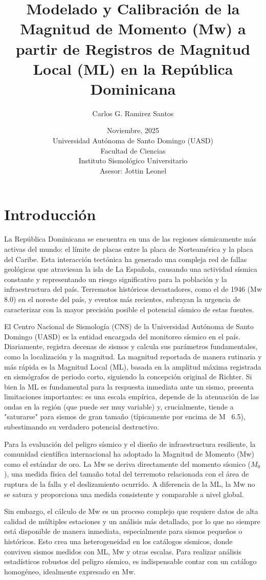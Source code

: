\documentclass[12pt,a4paper]{article}
\title{Modelado y Calibración de la Magnitud de Momento (Mw) a partir de Registros de Magnitud Local (ML) en la República Dominicana}
\author{Carlos G. Ramirez Santos}
\date{Noviembre, 2025 \\ \vspace{0.5cm} \small{Universidad Autónoma de Santo Domingo (UASD) \\ Facultad de Ciencias \\ Instituto Sismológico Universitario \\ Asesor: Jottin Leonel}}
\begin{document}
\maketitle

\newpage
\tableofcontents
\newpage

\section{Introducción}
La República Dominicana se encuentra en una de las regiones sísmicamente más activas del mundo: el límite de placas entre la placa de Norteamérica y la placa del Caribe. Esta interacción tectónica ha generado una compleja red de fallas geológicas que atraviesan la isla de La Española, causando una actividad sísmica constante y representando un riesgo significativo para la población y la infraestructura del país. Terremotos históricos devastadores, como el de 1946 (Mw 8.0) en el noreste del país, y eventos más recientes, subrayan la urgencia de caracterizar con la mayor precisión posible el potencial sísmico de estas fuentes.

El Centro Nacional de Sismología (CNS) de la Universidad Autónoma de Santo Domingo (UASD) es la entidad encargada del monitoreo sísmico en el país. Diariamente, registra decenas de sismos y calcula sus parámetros fundamentales, como la localización y la magnitud. La magnitud reportada de manera rutinaria y más rápida es la Magnitud Local (ML), basada en la amplitud máxima registrada en sismógrafos de periodo corto, siguiendo la concepción original de Richter. Si bien la ML es fundamental para la respuesta inmediata ante un sismo, presenta limitaciones importantes: es una escala empírica, depende de la atenuación de las ondas en la región (que puede ser muy variable) y, crucialmente, tiende a "saturarse" para sismos de gran tamaño (típicamente por encima de M ~6.5), subestimando su verdadero potencial destructivo.

Para la evaluación del peligro sísmico y el diseño de infraestructura resiliente, la comunidad científica internacional ha adoptado la Magnitud de Momento (Mw) como el estándar de oro. La Mw se deriva directamente del momento sísmico ($M_0$), una medida física del tamaño total del terremoto relacionada con el área de ruptura de la falla y el deslizamiento ocurrido. A diferencia de la ML, la Mw no se satura y proporciona una medida consistente y comparable a nivel global.

Sin embargo, el cálculo de Mw es un proceso complejo que requiere datos de alta calidad de múltiples estaciones y un análisis más detallado, por lo que no siempre está disponible de manera inmediata, especialmente para sismos pequeños o históricos. Esto crea una heterogeneidad en los catálogos sísmicos, donde conviven sismos medidos con ML, Mw y otras escalas. Para realizar análisis estadísticos robustos del peligro sísmico, es indispensable contar con un catálogo homogéneo, idealmente expresado en Mw.
\end{document}
